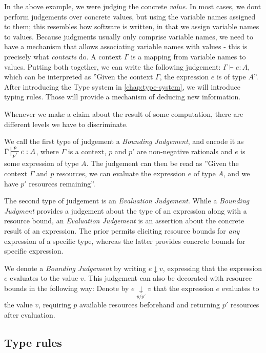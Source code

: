  In the above example, we were judging the concrete \emph{value}. In most cases, we dont perform judgements over concrete values, but using the variable names assigned to them; this resembles how software is written, in that we assign variable names to values.
 Because judgments usually only comprise variable names, we need to have a mechanism that allows associating variable names with values - this is precisely what \emph{contexts} do. A context \(\Gamma\) is a mapping from variable names to values. Putting both together, we can write the following judgement: \(\Gamma \vdash e: A\), which can be interpreted as ''Given the context \(\Gamma\), the expression \(e\) is of type \(A\)''.
 After introducing the Type system in \ref{chap:type-system}, we will introduce typing rules. Those will provide a mechanism of deducing new information. 
 
Whenever we make a claim about the result of some computation, there are different levels we have to discriminate.

 We call the first type of judgement a \emph{Bounding Judgement}, and encode it as \(\Gamma \sststile{p'}{p} e : A\), where \(\Gamma\) is a context, \(p\) and \(p'\) are non-negative rationals and \(e\) is some expression of type \(A\). The judgement can then be read as ''Given the context \(\Gamma\) and \(p\) resources, we can evaluate the expression \(e\) of type \(A\), and we have \(p'\) resources remaining''.

 The second type of judgement is an \emph{Evaluation Judgement}. While a \emph{Bounding Judgment} provides a judgement about the type of an expression along with a resource bound, an \emph{Evaluation Judgement} is an assertion about the concrete result of an expression. The prior permits eliciting resource bounds for \emph{any} expression of a specific type, whereas the latter provides concrete bounds for specific expression. 

 We denote a \emph{Bounding Judgement} by writing \(e \downarrow v\), expressing that the expression \(e\) evaluates to the value \(v\). This judgement can also be decorated with resource bounds in the following way: Denote by \(e \underset{p/p'}{\downarrow} v\) that the expression \(e\) evaluates to the value \(v\), requiring \(p\) available resources beforehand and returning \(p'\) resources after evaluation.


\subsection{Type rules}
\label{sec:type-rules}
